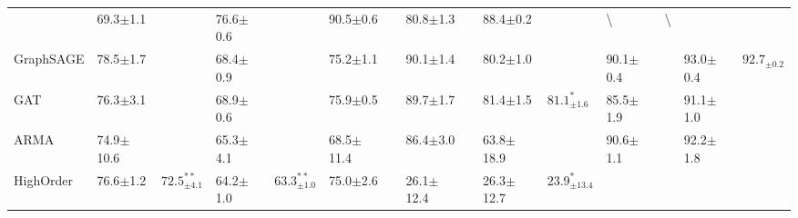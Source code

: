 \documentclass[letterpaper]{article} \usepackage{aaai20}  \usepackage{times}  \usepackage{helvet} \usepackage{courier}  \usepackage[hyphens]{url}  \usepackage{graphicx} \urlstyle{rm} \def\UrlFont{\rm}  \frenchspacing  \setlength{\pdfpagewidth}{8.5in}  \setlength{\pdfpageheight}{11in}  \setcounter{secnumdepth}{0}
\begin{document}
\begin{table*}[t]
{\begin{tabular}{l|ll|ll|ll|ll|ll|ll|ll}
& 69.3\tiny$\pm$1.1        & \cellcolor{shallow_red}{$69.4^{*}_{\pm1.0}$}   
& 76.6\tiny$\pm$0.6        & \cellcolor{middle_red}{$77.2^{*}_{\pm0.4}$} 
& 90.5\tiny$\pm$0.6        & \cellcolor{shallow_red}{$90.8^{**}_{\pm0.6}$}        
& 80.8\tiny$\pm$1.3        & \cellcolor{middle_red}{$81.7^{**}_{\pm0.9}$}        
& 88.4\tiny$\pm$0.2        & \cellcolor{middle_red}{$88.9^{**}_{\pm0.2}$}      
& \textbackslash{}   & \textbackslash{}
           \\ 
GraphSAGE  
& 78.5\tiny$\pm$1.7        & \cellcolor{middle_red}{$80.2^{**}_{\pm1.2}$}      
& 68.4\tiny$\pm$0.9        & \cellcolor{deep_red}{$69.4^{**}_{\pm0.8}$}
& 75.2\tiny$\pm$1.1        & \cellcolor{deep_red}{$77.2^{**}_{\pm0.8}$}      
& 90.1\tiny$\pm$1.4        & \cellcolor{middle_red}{$90.6^{**}_{\pm0.5}$}       
& 80.2\tiny$\pm$1.0        & \cellcolor{middle_red}{$81.1^{**}_{\pm1.0}$}      
& 90.1\tiny$\pm$0.4        & \cellcolor{shallow_red}{$90.3^{**}_{\pm0.4}$}    
& 93.0\tiny$\pm$0.4        & {$92.7_{\pm0.2}$} 
    \\ 
GAT        
& 76.3\tiny$\pm$3.1        & \cellcolor{deep_red}{$77.9^{**}_{\pm2.0}$}       
& 68.9\tiny$\pm$0.6        & \cellcolor{shallow_red}{$69.1^{*}_{\pm0.8}$}
& 75.9\tiny$\pm$0.5        & \cellcolor{deep_red}{$76.6^{**}_{\pm0.2}$}       
 & 89.7\tiny$\pm$1.7        & \cellcolor{deep_red}{$90.8^{**}_{\pm0.9}$}        
& 81.4\tiny$\pm$1.5        & {$81.1^{*}_{\pm1.6}$}        
& 85.5\tiny$\pm$1.9        & \cellcolor{deep_red}{$86.6^{**}_{\pm1.6}$}       
& 91.1\tiny$\pm$1.0         &\cellcolor{shallow_red}{$91.4^{*}_{\pm1.0}$} 
     \\ 
ARMA       
& 74.9\tiny$\pm$10.6       & \cellcolor{deep_red}{$76.4^{**}_{\pm5.6}$}        
& 65.3\tiny$\pm$4.1        & \cellcolor{middle_red}{$66.1^{**}_{\pm4.3}$} 
& 68.5\tiny$\pm$11.4        & \cellcolor{middle_red}{$68.9^{*}_{\pm12.2}$}        
& 86.4\tiny$\pm$3.0        & \cellcolor{middle_red}{$87.0^{**}_{\pm1.9}$}        
& 63.8\tiny$\pm$18.9       & \cellcolor{deep_red}{$71.7^{**}_{\pm8.1}$}       
& 90.6\tiny$\pm$1.1        & \cellcolor{shallow_red}{$90.9^{**}_{\pm0.6}$}      
& 92.2\tiny$\pm$1.8         & \cellcolor{shallow_red}{$92.6^{*}_{\pm1.0}$}
          \\ 
HighOrder  
& 76.6\tiny$\pm$1.2        & {$72.5^{**}_{\pm4.1}$}        
& 64.2\tiny$\pm$1.0        & {$63.3^{**}_{\pm1.0}$}
& 75.0\tiny$\pm$2.6        & \cellcolor{deep_red}{$76.9^{**}_{\pm1.3}$}         
& 26.1\tiny$\pm$12.4       & \cellcolor{deep_red}{$30.3^{**}_{\pm10.2}$}       
& 26.3\tiny$\pm$12.7       & {$23.9^{*}_{\pm13.4}$}       

\end{tabular}}
\end{table*}
\end{document}
